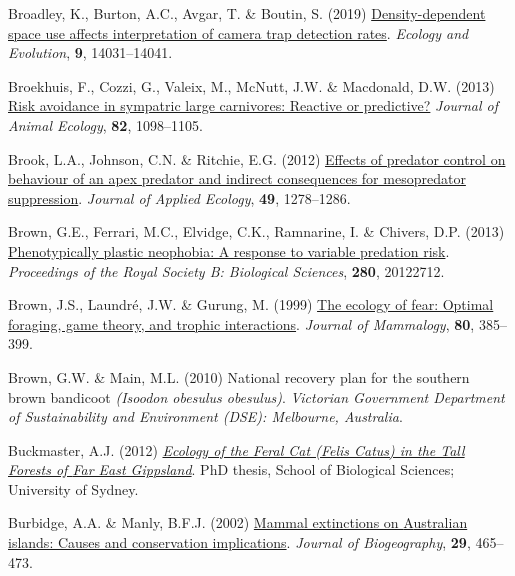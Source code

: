 \documentclass[11pt,a4paper,titlepage,twoside,openright]{style/unimelbthesis}
\newenvironment{CSLReferences}%
  {}%
  {\par}
\begin{document}
\begin{mainmatter}
\begin{CSLReferences}{1}{0}
\leavevmode{}%
Broadley, K., Burton, A.C., Avgar, T. \& Boutin, S. (2019) \href{https://doi.org/10.1002/ece3.5840}{Density-dependent space use affects interpretation of camera trap detection rates}. \emph{Ecology and Evolution}, \textbf{9}, 14031--14041.

\leavevmode{}%
Broekhuis, F., Cozzi, G., Valeix, M., McNutt, J.W. \& Macdonald, D.W. (2013) \href{https://doi.org/10.1111/1365-2656.12077}{Risk avoidance in sympatric large carnivores: Reactive or predictive?} \emph{Journal of Animal Ecology}, \textbf{82}, 1098--1105.

\leavevmode{}%
Brook, L.A., Johnson, C.N. \& Ritchie, E.G. (2012) \href{https://doi.org/10.1111/j.1365-2664.2012.02207.x}{Effects of predator control on behaviour of an apex predator and indirect consequences for mesopredator suppression}. \emph{Journal of Applied Ecology}, \textbf{49}, 1278--1286.

\leavevmode{}%
Brown, G.E., Ferrari, M.C., Elvidge, C.K., Ramnarine, I. \& Chivers, D.P. (2013) \href{https://doi.org/10.1098/rspb.2012.2712}{Phenotypically plastic neophobia: A response to variable predation risk}. \emph{Proceedings of the Royal Society B: Biological Sciences}, \textbf{280}, 20122712.

\leavevmode{}%
Brown, J.S., Laundré, J.W. \& Gurung, M. (1999) \href{https://doi.org/10.2307/1383287}{The ecology of fear: Optimal foraging, game theory, and trophic interactions}. \emph{Journal of Mammalogy}, \textbf{80}, 385--399.

\leavevmode{}%
Brown, G.W. \& Main, M.L. (2010) National recovery plan for the southern brown bandicoot \emph{({Isoodon obesulus obesulus})}. \emph{Victorian Government Department of Sustainability and Environment (DSE): Melbourne, {A}ustralia}.

\leavevmode{}%
Buckmaster, A.J. (2012) \emph{\href{http://hdl.handle.net/2123/8123}{Ecology of the Feral Cat (Felis Catus) in the Tall Forests of {Far East Gippsland}}}. PhD thesis, School of Biological Sciences; University of Sydney.

\leavevmode{}%
Burbidge, A.A. \& Manly, B.F.J. (2002) \href{https://doi.org/10.1046/j.1365-2699.2002.00699.x}{Mammal extinctions on {{A}ustralian} islands: Causes and conservation implications}. \emph{Journal of Biogeography}, \textbf{29}, 465--473.


\end{CSLReferences}
\end{mainmatter}
\end{document}

